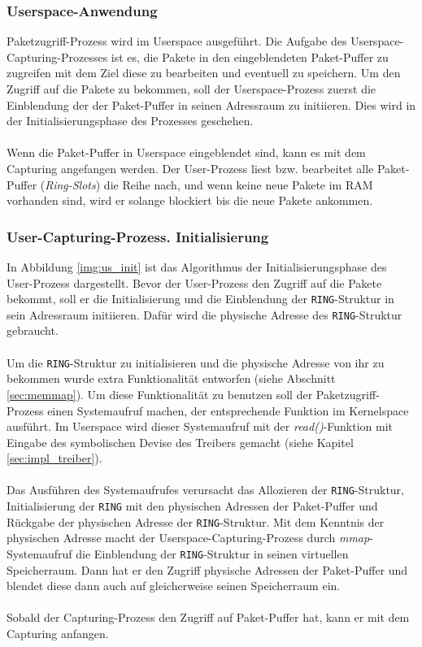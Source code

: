 \subsubsection{Userspace-Anwendung}
Paketzugriff-Prozess wird im Userspace ausgeführt.  Die Aufgabe des
Userspace-Capturing-Prozesses ist es, die Pakete in den eingeblendeten
Paket-Puffer zu zugreifen mit dem Ziel diese  zu bearbeiten und eventuell zu
speichern.  Um den Zugriff auf die Pakete zu bekommen, soll der
Userspace-Prozess zuerst die Einblendung der der Paket-Puffer in seinen
Adressraum zu initiieren.  Dies wird in der Initialisierungsphase des
Prozesses geschehen.\\\\
%
Wenn die Paket-Puffer in Userspace eingeblendet sind, kann es mit dem Capturing
angefangen werden. Der User-Prozess liest bzw. bearbeitet alle Paket-Puffer
(\emph{Ring-Slots}) die Reihe nach, und wenn keine neue Pakete im RAM vorhanden
sind, wird er solange blockiert bis die neue Pakete ankommen.

\subsubsection*{User-Capturing-Prozess. Initialisierung}
In Abbildung \ref{img:us_init} ist das Algorithmus der Initialisierungsphase
des User-Prozess dargestellt. Bevor der User-Prozess den Zugriff auf die Pakete
bekommt, soll er die Initialisierung und die Einblendung der 
\verb+RING+-Struktur in sein Adressraum initiieren.  Dafür wird die physische
Adresse des \verb+RING+-Struktur gebraucht. \\\\
%
Um die \verb+RING+-Struktur zu initialisieren und die physische Adresse von ihr
zu bekommen wurde extra Funktionalität entworfen (siehe Abschnitt
\ref{sec:memmap}). Um diese Funktionalität zu benutzen soll der
Paketzugriff-Prozess einen Systemaufruf machen, der entsprechende Funktion im
Kernelspace ausführt.  Im Userspace wird dieser Systemaufruf mit der
\emph{read()}-Funktion mit Eingabe  des symbolischen Devise des Treibers
gemacht (siehe Kapitel \ref{sec:impl_treiber}).\\\\
%
Das Ausführen des Systemaufrufes verursacht das Allozieren der
\verb+RING+-Struktur, Initialisierung der \verb+RING+ mit den physischen
Adressen der Paket-Puffer und Rückgabe der physischen Adresse der
\verb+RING+-Struktur. Mit dem Kenntnis der physischen Adresse macht der
Userspace-Capturing-Prozess durch \emph{mmap}-Systemaufruf die Einblendung der
\verb+RING+-Struktur in seinen virtuellen Speicherraum. Dann hat er den Zugriff
physische Adressen der Paket-Puffer und blendet diese dann auch auf
gleicherweise seinen Speicherraum ein.\\\\
Sobald der Capturing-Prozess den Zugriff auf Paket-Puffer hat, kann er mit dem 
Capturing anfangen.

